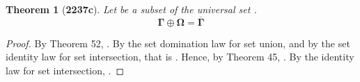 \documentclass[preview]{standalone}
\newtheorem{theorem}{Theorem}
\begin{document}
\begin{theorem}[\textbf{2237c}]
    Let \bm{$\Gamma$} be a subset of the universal set \bm{$\Omega$}. 
    \begin{equation*}
        \bm{\Gamma \oplus \Omega = \overline{\Gamma}}
    \end{equation*}
\end{theorem}
\begin{proof}
    By Theorem 52, 
    \bm{$
    \Gamma \oplus \Omega
        = 
    \big \langle \Gamma \cup \Omega \big \rangle
        - 
    \big \langle \Gamma \cap \Omega \big \rangle
    $}. 
    By the set domination law for set union, and by the set 
    identity law for set intersection, that is \bm{$\Omega - \Gamma$}. 
    Hence, by Theorem 45, 
    \bm{$\Omega \cap \overline{\Gamma}$}.
    By the identity law for set intersection,
    \bm{$\Gamma \oplus \Omega = \overline{\Gamma}$}.
\end{proof}
\end{document}
